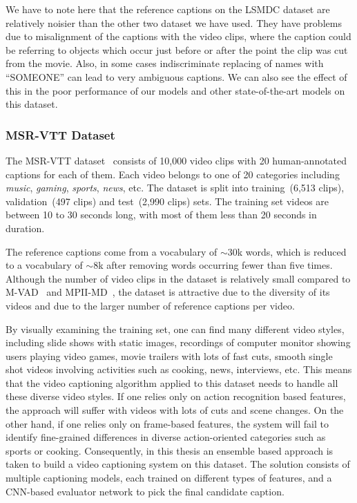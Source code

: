 We have to note here that the reference captions on the LSMDC dataset are
relatively noisier than the other two dataset we have used.
They have problems due to misalignment of the captions with the video clips,
where the caption could be referring to objects which occur just before or after
the point the clip was cut from the movie. 
Also, in some cases indiscriminate replacing of names with ``SOMEONE'' can lead
to very ambiguous captions.
We can also see the effect of this in the poor performance of our models and
other state-of-the-art models on this dataset.

\subsubsection{MSR-VTT Dataset}
The MSR-VTT dataset~\cite{Xu:CVPR16} consists of 10,000 video clips with 20
human-annotated captions for each of them.
Each video belongs to one of 20 categories including \emph{music},
\emph{gaming}, \emph{sports}, \emph{news}, etc.
The dataset is split into training~(6,513 clips), validation~(497 clips) and
test~(2,990 clips) sets. 
The training set videos are between 10 to 30 seconds long, with most of them
less than 20 seconds in duration.

The reference captions come from a vocabulary of $\sim$30k words, which is
reduced to a vocabulary of $\sim$8k after removing words occurring fewer than
five times.
Although the number of video clips in the dataset is relatively small compared
to M-VAD~\cite{rohrbach15cvpr} and MPII-MD~\cite{AtorabiM-VAD2015}, the dataset
is attractive due to the diversity of its videos and due to the larger number of
reference captions per video.

By visually examining the training set, one can find many different video styles,
including slide shows with static images, recordings of computer monitor showing
users playing video games, movie trailers with lots of fast cuts, smooth single
shot videos involving activities such as cooking, news, interviews, etc.
This means that the video captioning algorithm applied to this dataset needs to
handle all these diverse video styles.
If one relies only on action recognition based features, the approach will suffer
with videos with lots of cuts and scene changes.
On the other hand, if one relies only on frame-based features, the system will fail
to identify fine-grained differences in diverse action-oriented categories such
as sports or cooking.
Consequently, in this thesis an ensemble based approach is taken to build a video
captioning system on this dataset.
The solution consists of multiple captioning models, each trained on different
types of features, and a CNN-based evaluator network to pick the final candidate
caption.

